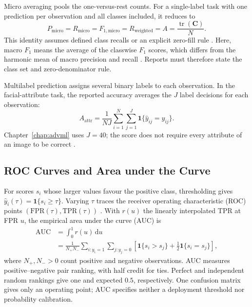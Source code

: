 Micro averaging pools the one-versus-rest counts. For a single-label task with one prediction
per observation and all classes included, it reduces to
\begin{equation}
  P_{\mathrm{micro}}=R_{\mathrm{micro}}=F_{1,\mathrm{micro}}
  =R_{\mathrm{weighted}}=A=\frac{\operatorname{tr}(\mathbf C)}{N}.
  \label{eq:background:micro-identity}
\end{equation}
This identity assumes defined class recalls or an explicit zero-fill rule
\cite{grandini2020metrics}. Here, macro $F_1$ means the average of the classwise $F_1$ scores,
which differs from the harmonic mean of macro precision and recall
\cite{opitz2019macrof1}. Reports must therefore state the class set and zero-denominator rule.

Multilabel prediction assigns several binary labels to each observation. In the facial-attribute
task, the reported accuracy averages the $J$ label decisions for each observation:
\begin{equation}
  A_{\mathrm{attr}}=\frac1{NJ}\sum_{i=1}^{N}\sum_{j=1}^{J}
    \mathbf1\{\widehat y_{ij}=y_{ij}\}.
  \label{eq:background:attribute-accuracy}
\end{equation}
Chapter~\ref{chap:advml} uses $J=40$; the score does not require every attribute of an image
to be correct \cite{sparta2022d76}.

\subsection{ROC Curves and Area under the Curve}
\label{sec:background:metrics:roc}

For scores $s_i$ whose larger values favour the positive class, thresholding gives
$\widehat y_i(\tau)=\mathbf1\{s_i\geq\tau\}$. Varying $\tau$ traces the receiver operating
characteristic (ROC) points $(\mathrm{FPR}(\tau),\mathrm{TPR}(\tau))$
\cite{fawcett2006roc}. With $r(u)$ the linearly interpolated TPR at FPR $u$, the empirical area
under the curve (AUC) is
\begin{equation}
  \begin{aligned}
    \mathrm{AUC}&=\int_0^1 r(u)\,\mathrm du\\
    &=\frac1{N_+N_-}\sum_{i:y_i=1}\sum_{j:y_j=0}
      \left[\mathbf1\{s_i>s_j\}+\frac12\mathbf1\{s_i=s_j\}\right],
  \end{aligned}
  \label{eq:background:auc}
\end{equation}
where $N_+,N_->0$ count positive and negative observations. AUC measures positive--negative pair ranking,
with half credit for ties. Perfect and independent random rankings give one and expected
$0.5$, respectively. One confusion matrix gives only an operating point; AUC specifies neither
a deployment threshold nor probability calibration.

